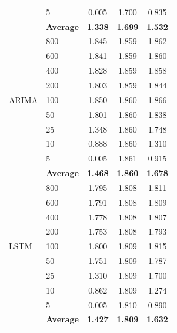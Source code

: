 \documentclass[11pt,a4paper]{article}
\begin{document}
\begin{table}[H]
\begin{tabular}{llccc}
 & 5   & 0.005 & 1.700 & 0.835 \\
 & \textbf{Average} & \textbf{1.338} & \textbf{1.699} & \textbf{1.532} \\
\midrule
\multirow{9}{*}{ARIMA}
 & 800 & 1.845 & 1.859 & 1.862 \\
 & 600 & 1.841 & 1.859 & 1.860 \\
 & 400 & 1.828 & 1.859 & 1.858 \\
 & 200 & 1.803 & 1.859 & 1.844 \\
 & 100 & 1.850 & 1.860 & 1.866 \\
 & 50  & 1.801 & 1.860 & 1.838 \\
 & 25  & 1.348 & 1.860 & 1.748 \\
 & 10  & 0.888 & 1.860 & 1.310 \\
 & 5   & 0.005 & 1.861 & 0.915 \\
 & \textbf{Average} & \textbf{1.468} & \textbf{1.860} & \textbf{1.678} \\
\midrule
\multirow{9}{*}{LSTM}
 & 800 & 1.795 & 1.808 & 1.811 \\
 & 600 & 1.791 & 1.808 & 1.809 \\
 & 400 & 1.778 & 1.808 & 1.807 \\
 & 200 & 1.753 & 1.808 & 1.793 \\
 & 100 & 1.800 & 1.809 & 1.815 \\
 & 50  & 1.751 & 1.809 & 1.787 \\
 & 25  & 1.310 & 1.809 & 1.700 \\
 & 10  & 0.862 & 1.809 & 1.274 \\
 & 5   & 0.005 & 1.810 & 0.890 \\
 & \textbf{Average} & \textbf{1.427} & \textbf{1.809} & \textbf{1.632} \\
\bottomrule
\end{tabular}
\end{table}
\end{document}
